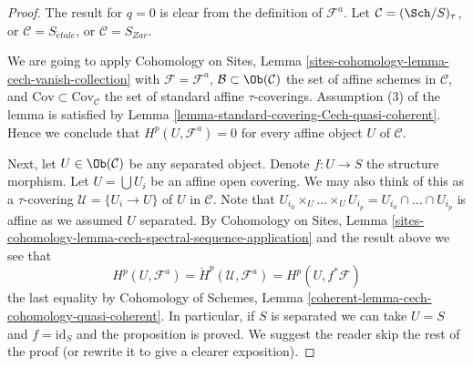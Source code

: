 \begin{proof}
The result for $q = 0$ is clear from the definition of $\mathcal{F}^a$.
Let $\mathcal{C} = (\Sch/S)_\tau$, or $\mathcal{C} = S_{\acute{e}tale}$,
or $\mathcal{C} = S_{Zar}$.

\medskip\noindent
We are going to apply
Cohomology on Sites,
Lemma \ref{sites-cohomology-lemma-cech-vanish-collection}
with $\mathcal{F} = \mathcal{F}^a$,
$\mathcal{B} \subset \Ob(\mathcal{C})$ the set of affine schemes
in $\mathcal{C}$, and $\text{Cov} \subset \text{Cov}_\mathcal{C}$ the
set of standard affine $\tau$-coverings. Assumption (3) of
the lemma is satisfied by
Lemma \ref{lemma-standard-covering-Cech-quasi-coherent}.
Hence we conclude that $H^p(U, \mathcal{F}^a) = 0$ for every
affine object $U$ of $\mathcal{C}$.

\medskip\noindent
Next, let $U \in \Ob(\mathcal{C})$ be any separated object.
Denote $f : U \to S$ the structure morphism.
Let $U = \bigcup U_i$ be an affine open covering.
We may also think of this as a $\tau$-covering
$\mathcal{U} = \{U_i \to U\}$ of $U$ in $\mathcal{C}$.
Note that
$U_{i_0} \times_U \ldots \times_U U_{i_p} =
U_{i_0} \cap \ldots \cap U_{i_p}$ is affine as we assumed $U$ separated.
By
Cohomology on Sites, Lemma
\ref{sites-cohomology-lemma-cech-spectral-sequence-application}
and the result above we see that
$$
H^p(U, \mathcal{F}^a) = \check{H}^p(\mathcal{U}, \mathcal{F}^a)
= H^p(U, f^*\mathcal{F})
$$
the last equality by
Cohomology of Schemes, Lemma
\ref{coherent-lemma-cech-cohomology-quasi-coherent}.
In particular, if $S$ is separated we can take $U = S$ and
$f = \text{id}_S$ and the proposition is proved.
We suggest the reader skip the rest of the proof (or rewrite it
to give a clearer exposition).


\end{proof}
